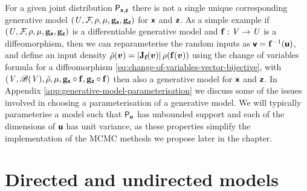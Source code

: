 For a given joint distribution $\mathsf{P}_{\boldsymbol{\mathsf{x}},\boldsymbol{\mathsf{z}}}$ there is not a single unique corresponding generative model $(\mathit{U},\mathcal{F}\kern-2pt,\rho,\mu,{\mathbf{g}}_{\boldsymbol{\mathsf{x}}},{\mathbf{g}}_{\boldsymbol{\mathsf{z}}})$ for $\boldsymbol{\mathsf{x}}$ and $\boldsymbol{\mathsf{z}}$. As a simple example if $(\mathit{U},\mathcal{F}\kern-2pt,\rho,\mu,{\mathbf{g}}_{\boldsymbol{\mathsf{x}}},{\mathbf{g}}_{\boldsymbol{\mathsf{z}}})$ is a differentiable generative model and ${\mathbf{f}} : \mathit{V} \to \mathit{U}$ is a diffeomorphism, then we can reparameterise the random inputs as $\boldsymbol{\mathsf{v}} = {\mathbf{f}}^{-1}(\boldsymbol{\mathsf{u}})$, and define an input density $\tilde{\rho}(\vct{v}) = \left|\jacob{\vctfunc{f}}{\vct{v}}\right|\, \rho\lpa \vctfunc{f}(\vct{v})\rpa$ using the change of variables formula for a diffeomorphism \eqref{eq:change-of-variables-vector-bijective}, with $(\mathit{V},\mathscr{B}(\mathit{V}),\tilde{\rho},\mu,{\mathbf{g}}_{\boldsymbol{\mathsf{x}}}\circ{\mathbf{f}},{\mathbf{g}}_{\boldsymbol{\mathsf{z}}}\circ{\mathbf{f}})$ then also a generative model for $\boldsymbol{\mathsf{x}}$ and $\boldsymbol{\mathsf{z}}$. In Appendix \ref{app:generative-model-parameterisation} we discuss some of the issues involved in choosing a parameterisation of a generative model. We will typically parameterise a model such that $\mathsf{P}_{\boldsymbol{\mathsf{u}}}$ has unbounded support and each of the dimensions of $\boldsymbol{\mathsf{u}}$ has unit variance, as these properties simplify the implementation of the \ac{MCMC} methods we propose later in the chapter.

\section{Directed and undirected models}

